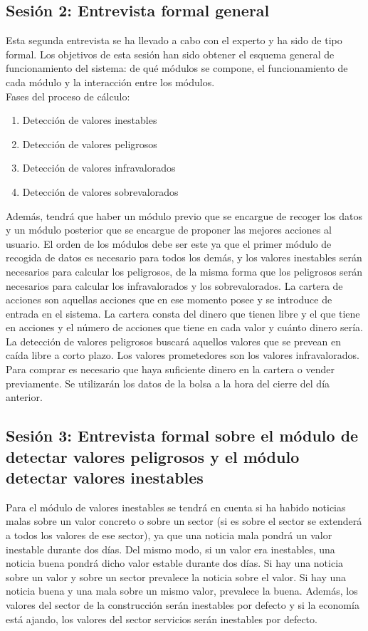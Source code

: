 \documentclass[12pt]{article}
\begin{document}
\subsection{Sesión 2: Entrevista formal general}
Esta segunda entrevista se ha llevado a cabo con el experto y ha sido de tipo formal. Los objetivos de esta sesión han sido obtener el esquema general de funcionamiento del sistema: de qué módulos se compone, el funcionamiento de cada módulo y la interacción entre los módulos.\\

Fases del proceso de cálculo:
\begin{enumerate}
\item Detección de valores inestables
\item Detección de valores peligrosos
\item Detección de valores infravalorados
\item Detección de valores sobrevalorados
\end{enumerate}

Además, tendrá que haber un módulo previo que se encargue de recoger los datos y un módulo posterior que se encargue de proponer las mejores acciones al usuario. El orden de los módulos debe ser este ya que el primer módulo de recogida de datos es necesario para todos los demás, y los valores inestables serán necesarios para calcular los peligrosos, de la misma forma que los peligrosos serán necesarios para calcular los infravalorados y los sobrevalorados. La cartera de acciones son aquellas acciones que en ese momento posee y se introduce de entrada en el sistema. La cartera consta del dinero que tienen libre y el que tiene en acciones y el número de acciones que tiene en cada valor y cuánto dinero sería.\\
La detección de valores peligrosos buscará aquellos valores que se prevean en caída libre a corto plazo. Los valores prometedores son los valores infravalorados. Para comprar es necesario que haya suficiente dinero en la cartera o vender previamente. Se utilizarán los datos de la bolsa a la hora del cierre del día anterior.

\subsection{Sesión 3: Entrevista formal sobre el módulo de detectar valores peligrosos y el módulo detectar valores inestables}
Para el módulo de valores inestables se tendrá en cuenta si ha habido noticias malas sobre un valor concreto o sobre un sector (si es sobre el sector se extenderá a todos los valores de ese sector), ya que una noticia mala pondrá un valor inestable durante dos días. Del mismo modo, si un valor era inestables, una noticia buena pondrá dicho valor estable durante dos días. Si hay una noticia sobre un valor y sobre un sector prevalece la noticia sobre el valor. Si hay una noticia buena y una mala sobre un mismo valor, prevalece la buena. Además, los valores del sector de la construcción serán inestables por defecto y si la economía está ajando, los valores del sector servicios serán inestables por defecto.
\end{document}
